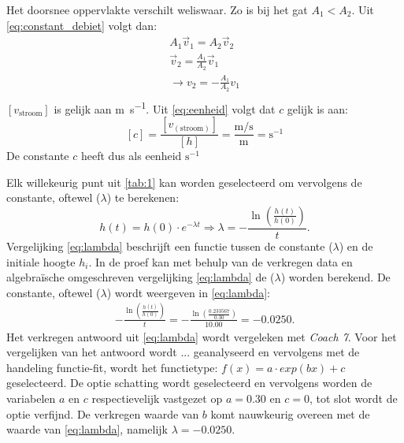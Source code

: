 \documentclass{scrartcl}
\begin{document}
Het doorsnee oppervlakte verschilt weliswaar. Zo is bij het gat $A_1 < A_2$. Uit \cref{eq:constant_debiet} volgt dan:
\begin{equation}\label{eq:v_h}
\begin{split}
    A_1\vec{v}_1 = A_2\vec{v}_2\\
    \vec{v}_2 = \frac{A_1}{A_2}\vec{v}_1\\
     \rightarrow v_2 = -\frac{A_1}{A_2}v_1\\
    \end{split}
    \end{equation}
$[v_{\text{stroom}}]$ is gelijk aan \si{\meter\per\second}. Uit \cref{eq:eenheid} volgt dat $c$ gelijk is aan:
\begin{equation}\label{eq:eenheid}
[c] = \frac{[v_{(\text{stroom})}]}{[h]} = \frac{\si{\meter\per\second}}{\si{\meter}} = \si{\second}^{-1}
\end{equation}
De constante $c$ heeft dus als eenheid $\si{\second}^{-1}$

Elk willekeurig punt uit \ref{tab:1} kan worden geselecteerd om vervolgens de constante, oftewel ($\lambda$) te berekenen:
\begin{equation}%
h(t) =h(0) \cdot e^{-\lambda t}
\Rightarrow \lambda = -\frac{\ln\left(\frac{h(t)}{h(0)}\right)}{t}.
\end{equation}
Vergelijking \cref{eq:lambda} beschrijft een functie tussen de constante ($\lambda$) en de initiale hoogte $h_i$. In de proef kan met behulp van de verkregen data en algebraïsche omgeschreven vergelijking \cref{eq:lambda} de ($\lambda$) worden berekend. De constante, oftewel ($\lambda$) wordt weergeven in \cref{eq:lambda}:
\begin{equation}
\begin{split}
-\frac{\ln\left(\frac{h(t)}{h(0)}\right)}{t}=-\frac{\ln\left(\frac{0.233567}{0.30}\right)}{10.00}=-0.0250.  
\end{split}
\end{equation}
Het verkregen antwoord uit \cref{eq:lambda} wordt vergeleken met \textit{Coach 7}. Voor het vergelijken van het antwoord wordt ... geanalyseerd en vervolgens met de handeling functie-fit, wordt het functietype: $f(x)=a \cdot exp(bx)+c$ geselecteerd. De optie schatting wordt geselecteerd en vervolgens worden de variabelen $a$ en $c$ respectievelijk vastgezet op $a=0.30$ en $c=0$, tot slot wordt de optie verfijnd. De verkregen waarde van $b$ komt nauwkeurig overeen met de waarde van \cref{eq:lambda}, namelijk $\lambda=-0.0250$.
\end{document}
